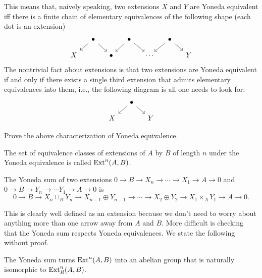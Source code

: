This means that, naively speaking, two extensions $X$ and $Y$ are Yoneda equivalent iff there is a finite chain of elementary equivalences of the following shape (each dot is an extension)
    \[\begin{tikzcd}[column sep=small,row sep=small]
                 & \bullet\arrow[dl]\arrow[dr]&         & \bullet\arrow[dl]\arrow[dr] &         &  \bullet\arrow[dl]\arrow[dr] \\
        X  &                             &\bullet &                             &\cdots &                             &Y 
    \end{tikzcd}\]
The nontrivial fact about extensions is that two extensions are Yoneda equivalent  if and only if there exists a single third extension that admits elementary equivalences into them, i.e., the following diagram is all one needs to look for:
    \[\begin{tikzcd}[column sep=small,row sep=small]
                 & \bullet\arrow[dl]\arrow[dr]&         \\
        X  &                                & Y
    \end{tikzcd}\]


\begin{xca}
    Prove the above characterization of Yoneda equivalence.
\end{xca}

\begin{defn}
    The set of equivalence classes of extensions of $A$ by $B$ of length $n$ under the Yoneda equivalence is called $\operatorname{Ext}^n(A,B)$.
\end{defn}

\begin{defn}
    The Yoneda sum of two extensions $0\to B\to X_n\to\cdots \to X_1\to A\to 0$ and $0\to B\to Y_n\to \cdots Y_1\to A\to 0$ is 
    \[0\to B\to X_n\sqcup_B Y_n\to X_{n-1}\oplus Y_{n-1}\to \cdots \to X_2\oplus Y_2\to X_1\times_A Y_1\to A\to 0.\]
\end{defn}

This is clearly well defined as an extension because we don't need to worry about anything more than one arrow away from $A$ and $B$. More difficult is checking that the Yoneda sum respects Yoneda equivalences. We state the following without proof.

\begin{thm}
    The Yoneda sum turns $\operatorname{Ext}^n(A,B)$ into an abelian group that is naturally isomorphic to $\operatorname{Ext}^n_R(A,B)$.
\end{thm}


